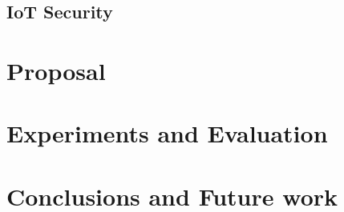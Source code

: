 \documentclass[letterpaper,conference]{IEEEtran}
\begin{document}
\subsection{IoT Security}

\section{Proposal}
 
\section{Experiments and Evaluation}

\section{Conclusions and Future work}
  




\end{document}

